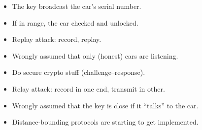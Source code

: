 \begin{frame}
  \begin{example}
    \begin{itemize}
      \item The key broadcast the car's serial number.
      \item If in range, the car checked and unlocked.
    \end{itemize}
  \end{example}

  \pause

  \begin{remark}
    \begin{itemize}
      \item Replay attack: record, replay.
      \item Wrongly assumed that only (honest) cars are listening.
    \end{itemize}
  \end{remark}
\end{frame}

\begin{frame}
  \begin{example}
    \begin{itemize}
      \item Do secure crypto stuff (challenge--response).
    \end{itemize}
  \end{example}

  \pause

  \begin{remark}
    \begin{itemize}
      \item Relay attack: record in one end, transmit in other.
      \item Wrongly assumed that the key is close if it \enquote{talks} to the 
        car.
      \item Distance-bounding protocols are starting to get implemented.
    \end{itemize}
  \end{remark}
\end{frame}



\begin{frame}
	\small
  \printbibliography
\end{frame}

